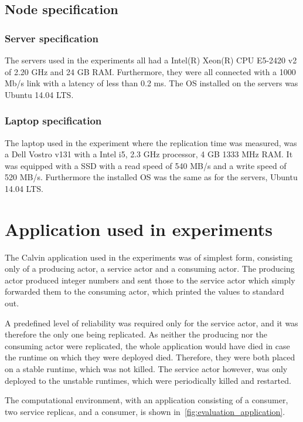 \documentclass{cslthse-msc}
\begin{document}
\subsection{Node specification}
\subsubsection{Server specification} \label{sec:server_spec}
The servers used in the experiments all had a Intel(R) Xeon(R) CPU E5-2420 v2 of 2.20 GHz and 24 GB RAM. Furthermore, they were all connected with a 1000 Mb/s link with a latency of less than 0.2 ms. The OS installed on the servers was Ubuntu 14.04 LTS.

\subsubsection{Laptop specification} \label{sec:laptop_spec}
The laptop used in the experiment where the replication time was measured, was a Dell Vostro v131 with a Intel i5, 2.3 GHz processor, 4 GB 1333 MHz RAM. It was equipped with a SSD with a read speed of 540 MB/s and a write speed of 520 MB/s. Furthermore the installed OS was the same as for the servers, Ubuntu 14.04 LTS.

\section{Application used in experiments} \label{sec:eval_application}
The Calvin application used in the experiments was of simplest form, consisting only of a producing actor, a service actor and a consuming actor. The producing actor produced integer numbers and sent those to the service actor which simply forwarded them to the consuming actor, which printed the values to standard out. 

A predefined level of reliability was required only for the service actor, and it was therefore the only one being replicated. As neither the producing nor the consuming actor were replicated, the whole application would have died in case the runtime on which they were deployed died. Therefore, they were both placed on a stable runtime, which was not killed. The service actor however, was only deployed to the unstable runtimes, which were periodically killed and restarted.

The computational environment, with an application consisting of a consumer, two service replicas, and a consumer, is shown in~\cref{fig:evaluation_application}.
\end{document}
